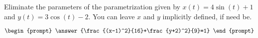 \documentclass{ximera}
\author{Gregory Hartman \and Matthew Carr}
\begin{document}
\begin{exercise}




Eliminate the parameters of the parametrization given by $x(t)=4\sin(t)+1$ and $y(t)=3\cos(t)-2$. You can leave $x$ and $y$ implicitly defined, if need be.

\[
\begin{prompt}
\answer{\frac{(x-1)^2}{16}+\frac{y+2)^2}{9}=1}
\end{prompt}
\]

\end{exercise}
\end{document}
